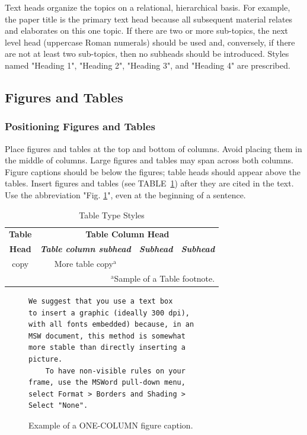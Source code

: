 \documentclass[conference]{IEEEtran}
\begin{document}
Text heads organize the topics on a relational, hierarchical basis. For example, the paper title is the primary text head because all subsequent material relates and elaborates on this one topic. If there are two or more sub-topics, the next level head (uppercase Roman numerals) should be used and, conversely, if there are not at least two sub-topics, then no subheads should be introduced. Styles named "Heading 1", "Heading 2", "Heading 3", and "Heading 4" are prescribed.

\subsection{Figures and Tables} 

\subsubsection{Positioning Figures and Tables} 
Place figures and tables at the top and bottom of columns. Avoid placing them in the middle of columns. Large figures and tables may span across both columns. Figure captions should be below the figures; table heads should appear above the tables. Insert figures and tables (see TABLE~\ref{tab:table}) after they are cited in the text. Use the abbreviation "Fig. \ref{fig:code}", even at the beginning of a sentence.

\begin{table}[htbp]
	\caption{Table Type Styles}
	\centering {}  
	\begin{center}
		\begin{tabular}{|c|c|c|c|}
			\hline
			\textbf{Table}&\multicolumn{3}{|c|}{\textbf{Table Column Head}} \\
			\cline{2-4} 
			\textbf{Head} & \textbf{\textit{Table column subhead}}& \textbf{\textit{Subhead}}& \textbf{\textit{Subhead}} \\
			\hline
			copy& More table copy$^{\mathrm{a}}$& &  \\
			\hline
			\multicolumn{4}{r}{$^{\mathrm{a}}$Sample of a Table footnote.}
		\end{tabular}
		\label{tab:table}
	\end{center}
\end{table}

\begin{figure}[htb]
	\centering
	\begin{lstlisting}[language={XML}] 
    We suggest that you use a text box 
to insert a graphic (ideally 300 dpi), 
with all fonts embedded) because, in an 
MSW document, this method is somewhat 
more stable than directly inserting a 
picture.
    To have non-visible rules on your 
frame, use the MSWord pull-down menu, 
select Format > Borders and Shading > 
Select "None".	
	\end{lstlisting} 
	\caption{Example of a ONE-COLUMN figure caption.}
	\label{fig:code}
\end{figure}
\end{document}
